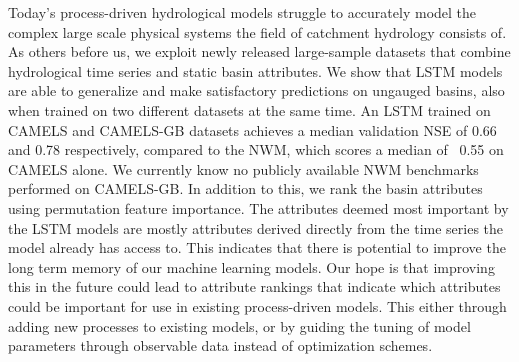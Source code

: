 Today's process-driven hydrological models struggle to accurately model the complex 
large scale physical systems the field of catchment hydrology consists of. 
As others before us, we exploit newly released large-sample datasets that combine 
hydrological time series and static basin attributes.
We show that LSTM models are able to generalize and make satisfactory predictions 
on ungauged basins, also when trained on two different datasets at the same time. 
An LSTM trained on CAMELS and CAMELS-GB datasets achieves a median validation NSE of 0.66 
and 0.78 respectively, compared to the NWM, which scores a median of ~0.55 on CAMELS alone.
We currently know no publicly available NWM benchmarks performed on CAMELS-GB.
In addition to this, we rank the basin attributes using permutation feature importance.
The attributes deemed most important by the LSTM models are mostly attributes derived 
directly from the time series the model already has access to. This indicates that 
there is potential to improve the long term memory of our machine learning models.
Our hope is that improving this in the future could lead to attribute rankings 
that indicate which attributes could be important for use in existing process-driven 
models. This either through adding new processes to existing models, or by guiding the 
tuning of model parameters through observable data instead of optimization schemes.
